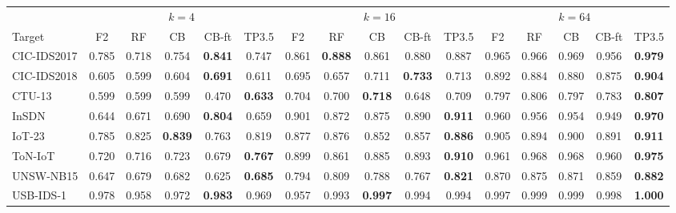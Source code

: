 \begin{tabular}{lccccccccccccccc}
\toprule
& \multicolumn{5}{c}{$k=4$} & \multicolumn{5}{c}{$k=16$} & \multicolumn{5}{c}{$k=64$} \\
\cmidrule(lr){2-6}\cmidrule(lr){7-11}\cmidrule(lr){12-16}
Target & F2 & RF & CB & CB-ft & TP3.5 & F2 & RF & CB & CB-ft & TP3.5 & F2 & RF & CB & CB-ft & TP3.5 \\
\midrule
CIC-IDS2017 & 0.785 & 0.718 & 0.754 & \textbf{0.841} & 0.747 & 0.861 & \textbf{0.888} & 0.861 & 0.880 & 0.887 & 0.965 & 0.966 & 0.969 & 0.956 & \textbf{0.979} \\
CIC-IDS2018 & 0.605 & 0.599 & 0.604 & \textbf{0.691} & 0.611 & 0.695 & 0.657 & 0.711 & \textbf{0.733} & 0.713 & 0.892 & 0.884 & 0.880 & 0.875 & \textbf{0.904} \\
CTU-13 & 0.599 & 0.599 & 0.599 & 0.470 & \textbf{0.633} & 0.704 & 0.700 & \textbf{0.718} & 0.648 & 0.709 & 0.797 & 0.806 & 0.797 & 0.783 & \textbf{0.807} \\
InSDN & 0.644 & 0.671 & 0.690 & \textbf{0.804} & 0.659 & 0.901 & 0.872 & 0.875 & 0.890 & \textbf{0.911} & 0.960 & 0.956 & 0.954 & 0.949 & \textbf{0.970} \\
IoT-23 & 0.785 & 0.825 & \textbf{0.839} & 0.763 & 0.819 & 0.877 & 0.876 & 0.852 & 0.857 & \textbf{0.886} & 0.905 & 0.894 & 0.900 & 0.891 & \textbf{0.911} \\
ToN-IoT & 0.720 & 0.716 & 0.723 & 0.679 & \textbf{0.767} & 0.899 & 0.861 & 0.885 & 0.893 & \textbf{0.910} & 0.961 & 0.968 & 0.968 & 0.960 & \textbf{0.975} \\
UNSW-NB15 & 0.647 & 0.679 & 0.682 & 0.625 & \textbf{0.685} & 0.794 & 0.809 & 0.788 & 0.767 & \textbf{0.821} & 0.870 & 0.875 & 0.871 & 0.859 & \textbf{0.882} \\
USB-IDS-1 & 0.978 & 0.958 & 0.972 & \textbf{0.983} & 0.969 & 0.957 & 0.993 & \textbf{0.997} & 0.994 & 0.994 & 0.997 & 0.999 & 0.999 & 0.998 & \textbf{1.000} \\
\bottomrule
\end{tabular}
